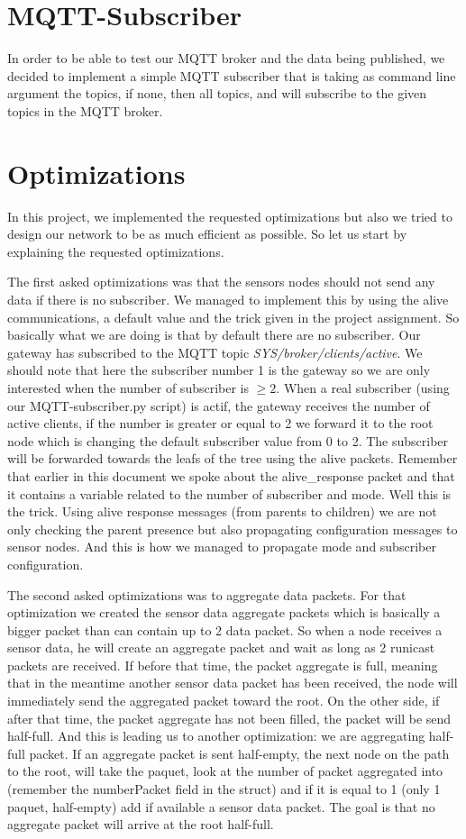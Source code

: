 \documentclass[a4paper,10pt]{article}
\begin{document}
\section{MQTT-Subscriber}
\label{subscriber}
In order to be able to test our MQTT broker and the data being published, we decided to implement a simple MQTT subscriber that is taking as command line argument the topics, if none, then all topics, and will subscribe to the given topics in the MQTT broker. 


\section{Optimizations}
\label{opti}
In this project, we implemented the requested optimizations but also we tried to design our network to be as much efficient as possible.  So let us start by explaining the requested optimizations.

The first asked optimizations was that the sensors nodes should not send any data if there is no subscriber. We managed to implement this by using the alive communications, a default value and the trick given in the project assignment. So basically what we are doing is that by default there are no subscriber. Our gateway has subscribed to the MQTT topic \emph{SYS/broker/clients/active}. We should note that here the subscriber number 1 is the gateway so we are only interested when the number of subscriber is $\geq 2$. When a real subscriber (using our MQTT-subscriber.py script) is actif, the gateway receives the number of active clients, if the number is greater or equal to 2 we forward it to the root node which is changing the default subscriber value from 0 to 2. The subscriber will be forwarded towards the leafs of the tree using the alive packets. Remember that earlier in this document we spoke about the alive\_response packet and that it contains a variable related to the number of subscriber and mode. Well this is the trick. Using alive response messages (from parents to children) we are not only checking the parent presence but also propagating configuration messages to sensor nodes. And this is how we managed to propagate mode and subscriber configuration. 

The second asked optimizations was to aggregate data packets. For that optimization we created the sensor data aggregate packets which is basically a bigger packet than can contain up to 2 data packet. So when a node receives a sensor data, he will create an aggregate packet and wait as long as 2 runicast packets are received. If before that time, the packet aggregate is full, meaning that in the meantime another sensor data packet has been received, the node will immediately send the  aggregated packet toward the root. On the other side, if after that time,  the packet aggregate has not been filled, the packet will be send half-full. And this is leading us to another optimization: we are aggregating half-full packet. If an aggregate packet is sent half-empty, the next node on the path to the root, will take the paquet, look at the number of packet aggregated into (remember the numberPacket field in the struct) and if it is equal to 1 (only 1 paquet, half-empty) add if available a sensor data packet. The goal is that no aggregate packet will arrive at the root half-full. 
\end{document}
